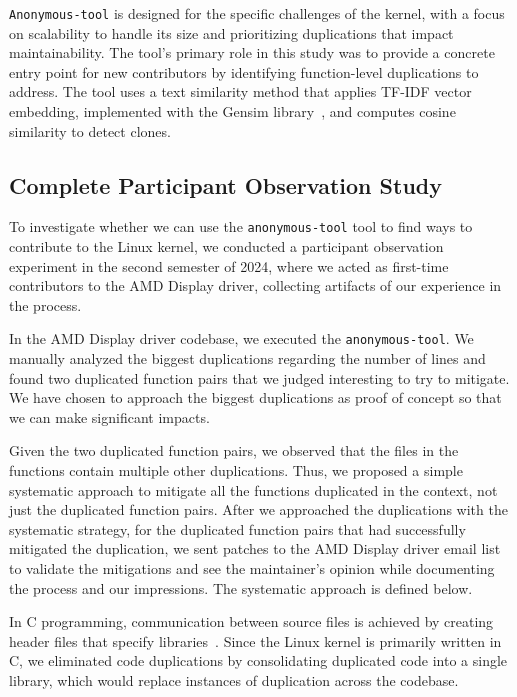 \documentclass[10pt,conference]{IEEEtran}
\begin{document}
\texttt{Anonymous-tool} is designed for the specific challenges of the kernel, with a focus on scalability to handle its size and prioritizing duplications that impact maintainability. The tool's primary role in this study was to provide a concrete entry point for new contributors by identifying function-level duplications to address. The tool uses a text similarity method that applies TF-IDF vector embedding, implemented with the Gensim library~\cite{gensim}, and computes cosine similarity to detect clones.

\subsection{Complete Participant Observation Study}
\label{sec:participant}

To investigate whether we can use the \texttt{anonymous-tool} tool to find ways to contribute to the Linux kernel, we conducted a participant observation experiment in the second semester of 2024, where we acted as first-time contributors to the AMD Display driver, collecting artifacts of our experience in the process.

In the AMD Display driver codebase, we executed the \texttt{anonymous-tool}. We manually analyzed the biggest duplications regarding the number of lines and found two duplicated function pairs that we judged interesting to try to mitigate. We have chosen to approach the biggest duplications as proof of concept so that we can make significant impacts. 

Given the two duplicated function pairs, we observed that the files in the functions 
contain multiple other duplications. Thus, we proposed a simple systematic approach 
to mitigate all the functions duplicated in the context, not just the duplicated 
function pairs. 
After we approached the duplications with the systematic strategy, for the duplicated 
function pairs that had successfully mitigated the duplication, we sent patches to the 
AMD Display driver email list to validate the mitigations and see the maintainer's opinion 
while documenting the process and our impressions.
The systematic approach is defined below. 

In C programming, communication between source files is achieved by creating header files that specify 
libraries~\cite{Cbook}. Since the Linux kernel is primarily written in C, we eliminated code duplications 
by consolidating duplicated code into a single library, which would replace instances of 
duplication across the codebase.
\end{document}
